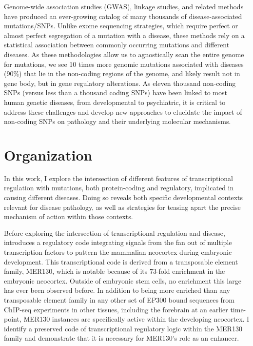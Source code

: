Genome-wide association studies (GWAS), linkage studies, and related methods have produced an ever-growing catalog of many thousands of disease-associated mutations/SNPs. Unlike exome sequencing strategies, which require perfect or almost perfect segregation of a mutation with a disease, these methods rely on a statistical association between commonly occurring mutations and different diseases. As these methodologies allow us to agnostically scan the entire genome for mutations, we see 10 times more genomic mutations associated with diseases (90\%) that lie in the non-coding regions of the genome, and likely result not in gene body, but in gene regulatory alterations. As eleven thousand non-coding SNPs (versus less than a thousand coding SNPs) have been linked to most human genetic diseases, from developmental to psychiatric, it is critical to address these challenges and develop new approaches to elucidate the impact of non-coding SNPs on pathology and their underlying molecular mechanisms.

\section{Organization}

In this work, I explore the intersection of different features of transcriptional regulation with mutations, both protein-coding and regulatory, implicated in causing different diseases. Doing so reveals both specific developmental contexts relevant for disease pathology, as well as strategies for teasing apart the precise mechanism of action within those contexts.

Before exploring the intersection of transcriptional regulation and disease,  introduces a regulatory code integrating signals from the fan out of multiple transcription factors to pattern the mammalian neocortex during embryonic development. This transcriptional code is derived from a transposable element family, MER130, which is notable because of its 73-fold enrichment in the embryonic neocortex. Outside of embryonic stem cells, no enrichment this large has ever been observed before. In addition to being more enriched than any transposable element family in any other set of EP300 bound sequences from ChIP-seq experiments in other tissues, including the forebrain at an earlier time-point, MER130 instances are specifically active within the developing neocortex. I identify a preserved code of transcriptional regulatory logic within the MER130 family and demonstrate that it is necessary for MER130’s role as an enhancer.


